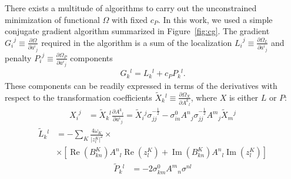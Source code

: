 \documentclass[aps,prl,reprint,amsmath,amssymb]{revtex4-1}
\begin{document}
There exists a multitude of algorithms to carry out the unconstrained minimization of functional $\Omega$ with fixed $c_P$. In this work, we used a simple conjugate gradient algorithm summarized in Figure~\ref{fig:cg}. The gradient ${G_i}^j \equiv \frac{\partial \Omega}{\partial {a^i}_j}$  required in the algorithm is a sum of the localization ${L_i}^j \equiv \frac{\partial \Omega_L}{\partial {a^i}_j}$ and penalty ${P_i}^j \equiv \frac{\partial \Omega_P}{\partial {a^i}_j}$ components
%
\begin{equation} \label{eq:grad}
\begin{split}
G{_k}^{l} = L{_k}^{l} + c_P P{_k}^{l}.
\end{split}
\end{equation}
%
These components can be readily expressed in terms of the derivatives with respect to the transformation coefficients $\tilde{X}{_k}^l \equiv \frac{\partial \Omega_X}{\partial {A^k}_l}$, where $X$ is either $L$ or $P$:
%
\begin{equation} \label{eq:grad-convert}
\begin{split}
{X_i}^j & = \tilde{X}{_k}^l \frac{\partial {A^k}_l}{\partial {a^i}_j} = \tilde{X}{_i}^j \sigma_{jj}^{-\frac{1}{2}} - \sigma_{in}^0 {A^n}_j  \sigma_{jj}^{-\frac{1}{2}} {A^m}_j \tilde{X}{_m}^j
\end{split}
\end{equation}
%
\begin{equation} \label{eq:grad-loc}
\begin{split}
\tilde{L}{_k}^l & = - \sum_K \frac{4 \omega_K}{\vert z_{l}^{K} \vert^2} \times \\ 
&\times \left[  \operatorname{Re}(B^{K}_{kn}) {A^{n}}_{l} \operatorname{Re}(z_{l}^{K}) + \operatorname{Im}(B^{K}_{kn}) {A^{n}}_{l} \operatorname{Im}(z_{l}^{K}) \right]
\end{split}
\end{equation}
%
\begin{equation} \label{eq:grad-pen}
\begin{split}
\tilde{P}{_k}^l & = -2 \sigma_{km}^0 {A^m}_n \sigma^{nl} 
\end{split}
\end{equation}
%
\end{document}
